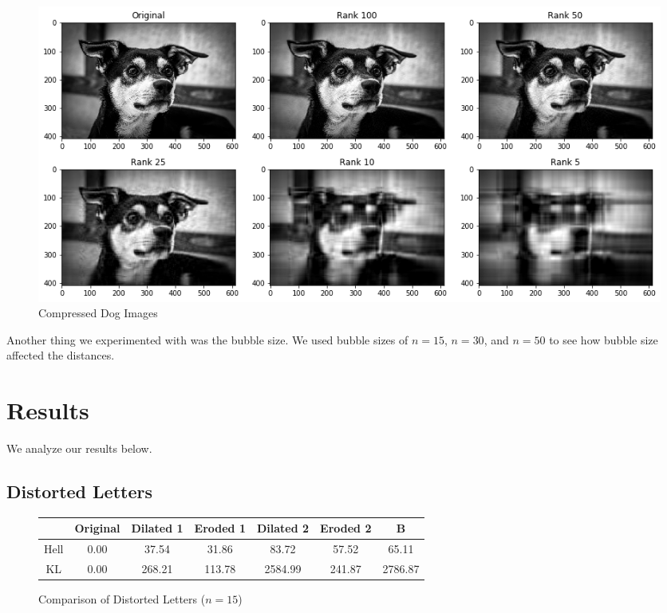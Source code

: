 \documentclass{article}
\begin{document}
\begin{figure}[h!]
\begin{center}
\includegraphics[width=\textwidth]{dogs.png}
\caption{Compressed Dog Images}
\label{fig:doggos}
\end{center}
\end{figure}

Another thing we experimented with was the bubble size. We used bubble sizes of
$n=15$, $n=30$, and $n=50$ to see how bubble size affected the distances.

\section{Results}

We analyze our results below.

\subsection{Distorted Letters}

\begin{figure}[h!]
\begin{center}
\begin{tabular}{ c || c | c | c | c | c | c }
    & Original & Dilated 1 & Eroded 1 & Dilated 2 & Eroded 2 & B \\ \hline
    Hell & 0.00 & 37.54 & 31.86 & 83.72 & 57.52 & 65.11 \\
    KL & 0.00 & 268.21 & 113.78 & 2584.99 & 241.87 & 2786.87
\end{tabular}
\caption{Comparison of Distorted Letters ($n=15$)}
\label{fig:a15}
\end{center}
\end{figure}
\end{document}
